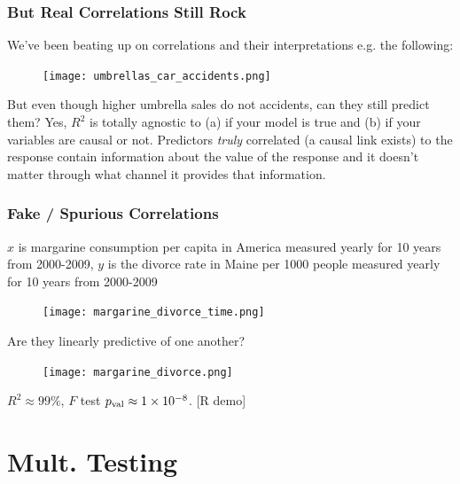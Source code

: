 \documentclass[slides]{beamer} %
\begin{document}
\begin{frame}\frametitle{But Real Correlations Still Rock}

We've been beating up on correlations and their interpretations e.g. the following:

\begin{figure}
\centering
\texttt{[image: umbrellas\_car\_accidents.png]}
\end{figure}
\pause

But even though higher umbrella sales do not  accidents, can they still predict them? \pause Yes, $R^2$ is totally agnostic to (a) if your model is true and \pause (b) if your variables are causal or not. Predictors \textit{truly} correlated (a causal link exists) to the response contain information about the value of the response and it doesn't matter through what channel it provides that information. \pause
	
\end{frame}

\begin{frame}\frametitle{Fake / Spurious Correlations}
\pause 

\footnotesize
$x$ is margarine consumption per capita in America measured yearly for 10 years from 2000-2009, $y$ is the divorce rate in Maine per 1000 people measured yearly for 10 years from 2000-2009

\vspace{-0.2cm}
\begin{figure}
\centering
\texttt{[image: margarine\_divorce\_time.png]}
\end{figure}

\vspace{-0.3cm}
Are they linearly predictive of one another? \pause

\vspace{-0.2cm}
\begin{figure}
\centering
\texttt{[image: margarine\_divorce.png]}
\end{figure}
\pause


\vspace{-0.3cm}
$R^2 \approx 99\%$, $F$ test $p_{\text{val}} \approx 1 \times 10^{-8}$. [R demo] 

	
\end{frame}

\section{Mult. Testing}
\end{document}
